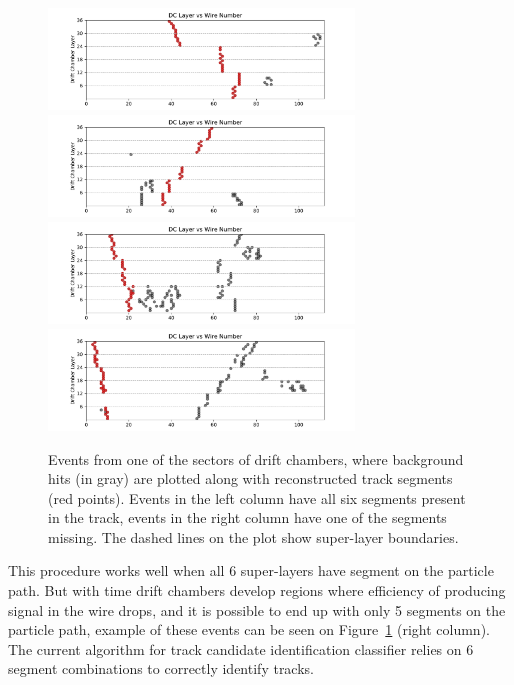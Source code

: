 \documentclass[12pt]{article}
\begin{document}
\begin{figure}[!ht]
\begin{center}
 \includegraphics[width=3.2in]{images/figure_raw_20.pdf}
 \includegraphics[width=3.2in]{images/figure_raw_22.pdf}
  \includegraphics[width=3.2in]{images/figure_raw_21.pdf}
   \includegraphics[width=3.2in]{images/figure_raw_23.pdf}
\caption {Events from one of the sectors of drift chambers, where background hits (in gray) are plotted along with 
reconstructed track segments (red points). Events in the left column have all six segments present in the track, events
in the right column have one of the segments missing. The dashed lines on the plot show super-layer boundaries.}
 \label{dc:display}
 \end{center}
\end{figure}

This procedure works well when all 6 super-layers have segment on the particle path. But with time drift chambers develop regions where efficiency of producing signal in the wire drops, and it is possible to end up with only 5 segments on the particle path, example of these events can be seen on Figure~\ref{dc:display} (right column). The current algorithm for track candidate identification classifier relies on 6 segment combinations to correctly identify tracks.
\end{document}
